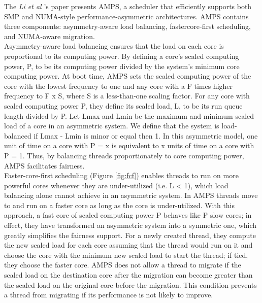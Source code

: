 \documentclass[a4paper,10pt]{article}
\begin{document}
\begin{multicols}{2}
The \emph{Li et al} 's paper \cite{Li07efficientoperating} presents AMPS, a scheduler that efficiently supports both SMP and NUMA-style performance-asymmetric architectures. AMPS contains three components: asymmetry-aware load balancing, fastercore-first scheduling, and NUMA-aware migration.\\
Asymmetry-aware load balancing ensures that the load on each core is proportional to its computing power. By defining a core's scaled computing power, P, to be its computing power divided by the system's minimum core computing power. At boot time, AMPS sets the scaled computing power of the core with the lowest frequency to one and any core with a F times higher frequency to F x S, where S is a less-than-one scaling factor. For any core with scaled computing power P, they define its scaled load, L, to be its run queue length divided by P. Let Lmax and Lmin be the maximum and minimum scaled load of a core in an asymmetric system. We define that the system is load-balanced if Lmax - Lmin is minor or equal then 1. In this asymmetric model, one unit of time on a core with P = x is equivalent to x units of time on a core with P = 1. Thus, by balancing threads proportionately to core computing power, AMPS facilitates fairness.\\
Faster-core-first scheduling (Figure \ref{fig:fcf}) enables threads to run on more powerful cores whenever they are under-utilized (i.e. L < 1), which load balancing alone cannot achieve in an asymmetric system. In AMPS threads move to and run on a faster core as long as the core is under-utilized. With this approach, a fast core of scaled computing power P behaves like P slow cores; in effect, they have transformed an asymmetric system into a symmetric one, which greatly simplifies the fairness support. For a newly created thread, they compute the new scaled load for each core assuming that the thread would run on it and choose the core with the minimum new scaled load to start the thread; if tied, they choose the faster core. AMPS does not allow a thread to migrate if the scaled load on the destination core after the migration can become greater than the  scaled load on the original core before the migration. This condition prevents a thread from migrating if its performance is not likely to improve.


\end{multicols}
\end{document}
